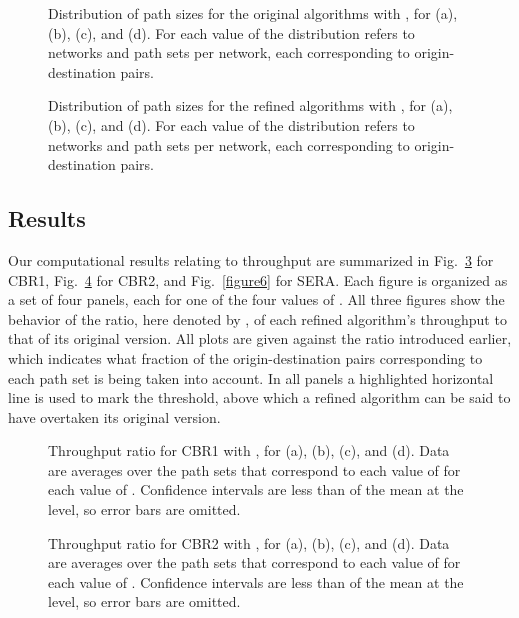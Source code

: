 \documentclass{article}
\begin{document}
\begin{figure}[p]
\centering
{}
\caption{Distribution of path sizes for the original algorithms with ,
for  (a),  (b),  (c), and  (d). For
each value of  the distribution refers to  networks and  path
sets per network, each corresponding to  origin-destination pairs.}
\label{figure2}
\end{figure}

\begin{figure}[p]
\centering
{}
\caption{Distribution of path sizes for the refined algorithms with , for
 (a),  (b),  (c), and  (d). For each
value of  the distribution refers to  networks and  path sets
per network, each corresponding to  origin-destination pairs.}
\label{figure3}
\end{figure}

\subsection{Results}\label{subsec:theresults}

Our computational results relating to throughput are summarized in
Fig.~\ref{figure4} for CBR1, Fig.~\ref{figure5} for CBR2, and Fig.~\ref{figure6}
for SERA. Each figure is organized as a set of four panels, each for one of the
four values of . All three figures show the behavior of the ratio, here
denoted by , of each refined algorithm's throughput to that of its
original version. All plots are given against the ratio  introduced
earlier, which indicates what fraction of the  origin-destination pairs
corresponding to each path set is being taken into account. In all panels a
highlighted horizontal line is used to mark the  threshold, above
which a refined algorithm can be said to have overtaken its original version.

\begin{figure}[p]
\centering
{}
\caption{Throughput ratio for CBR1 with , for  (a), 
(b),  (c), and  (d). Data are averages over the 
path sets that correspond to each value of  for each value of .
Confidence intervals are less than  of the mean at the  level, so
error bars are omitted.}
\label{figure4}
\end{figure}

\begin{figure}[p]
\centering
{}
\caption{Throughput ratio for CBR2 with , for  (a), 
(b),  (c), and  (d). Data are averages over the 
path sets that correspond to each value of  for each value of .
Confidence intervals are less than  of the mean at the  level, so
error bars are omitted.}
\label{figure5}
\end{figure}
\end{document}
